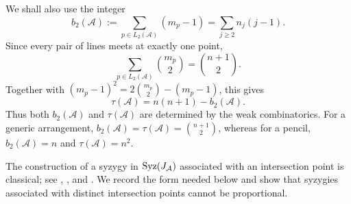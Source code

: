 \documentclass[11pt]{amsart}   %
\theoremstyle{definition}
\def\syz{\mbox{\rm Syz}}
\def\A{{\mathcal A}}
\begin{document}
We shall also use the integer
\[
b_2(\A)
:=
\sum_{p\in L_2(\A)}(m_p-1)
=
\sum_{j\geq2}n_j(j-1).
\]
Since every pair of lines meets at exactly one point,
\[
\sum_{p\in L_2(\A)}\binom{m_p}{2}
=
\binom{n+1}{2}.
\]
Together with $(m_p-1)^2=2\binom{m_p}{2}-(m_p-1)$, this gives
\begin{equation}
\label{eq:tjurina-b2-line-arrangement}
\tau(\A)=n(n+1)-b_2(\A).
\end{equation}
Thus both $b_2(\A)$ and $\tau(\A)$ are determined by the weak combinatorics. For a generic arrangement, $b_2(\A)=\tau(\A)=\binom{n+1}{2}$, whereas for a pencil, $b_2(\A)=n$ and $\tau(\A)=n^2$.

The construction of a syzygy in $\syz(J_\A)$ associated with an intersection point is classical; see \cite[Section~2.2]{Dimca-pencils}, \cite[Lemma~2.2]{Dimca-minimal-Tjurina}, and \cite[Theorem~1.3]{Dimca-local-derivations}. We record the form needed below and show that syzygies associated with distinct intersection points cannot be proportional.
\end{document}
